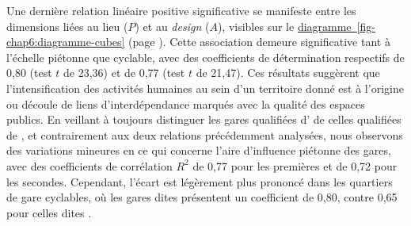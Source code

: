 \begin{refsegment}
Une dernière relation linéaire positive significative se manifeste entre les dimensions liées au lieu (\(P\)) et au \textsl{design} (\(A\)), visibles sur le \hyperref[fig-chap6:diagramme-cubes]{diagramme~\ref{fig-chap6:diagramme-cubes}} (page \pageref{fig-chap6:diagramme-cubes}). Cette association demeure significative tant à l'échelle piétonne que cyclable, avec des coefficients de détermination respectifs de 0,80 (test \(t\) de 23,36) et de 0,77 (test \(t\) de 21,47). Ces résultats suggèrent que l’intensification des activités humaines au sein d’un territoire donné est à l'origine ou découle de liens d’interdépendance marqués avec la qualité des espaces publics. En veillant à toujours distinguer les gares qualifiées d’ de celles qualifiées de , et contrairement aux deux relations précédemment analysées, nous observons des variations mineures en ce qui concerne l’aire d’influence piétonne des gares, avec des coefficients de corrélation \(R^2\) de 0,77 pour les premières et de 0,72 pour les secondes. Cependant, l’écart est légèrement plus prononcé dans les quartiers de gare cyclables, où les gares dites  présentent un coefficient de 0,80, contre 0,65 pour celles dites .%


\end{refsegment}
